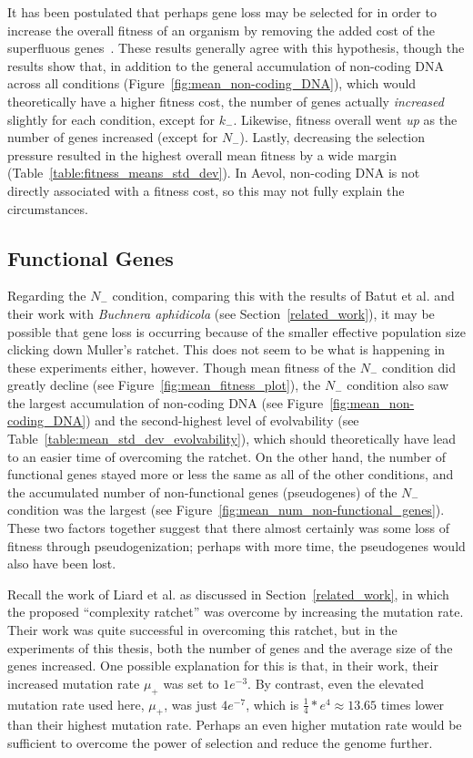 It has been postulated that perhaps gene loss may be selected for in order to increase the overall fitness of an organism by removing the added cost of the superfluous genes~\cite{koskiniemi2012}. These results generally agree with this hypothesis, though the results show that, in addition to the general accumulation of non-coding DNA across all conditions (Figure~\ref{fig:mean_non-coding_DNA}), which would theoretically have a higher fitness cost, the number of genes actually \textit{increased} slightly for each condition, except for $k_-$. Likewise, fitness overall went \textit{up} as the number of genes increased (except for $N_-$). Lastly, decreasing the selection pressure resulted in the highest overall mean fitness by a wide margin (Table~\ref{table:fitness_means_std_dev}). In Aevol, non-coding DNA is not directly associated with a fitness cost, so this may not fully explain the circumstances.  

\subsection{Functional Genes}
Regarding the $N_-$ condition, comparing this with the results of Batut et al. and their work with \textit{Buchnera aphidicola} (see Section~\ref{related_work}), it may be possible that gene loss is occurring because of the smaller effective population size clicking down Muller's ratchet. This does not seem to be what is happening in these experiments either, however. Though mean fitness of the $N_-$ condition did greatly decline (see Figure~\ref{fig:mean_fitness_plot}), the $N_-$ condition also saw the largest accumulation of non-coding DNA (see Figure~\ref{fig:mean_non-coding_DNA}) and the second-highest level of evolvability (see Table~\ref{table:mean_std_dev_evolvability}), which should theoretically have lead to an easier time of overcoming the ratchet. On the other hand, the number of functional genes stayed more or less the same as all of the other conditions, and the accumulated number of non-functional genes (pseudogenes) of the $N_-$ condition was the largest (see Figure~\ref{fig:mean_num_non-functional_genes}). These two factors together suggest that there almost certainly was some loss of fitness through pseudogenization; perhaps with more time, the pseudogenes would also have been lost.

Recall the work of Liard et al.\cite{Liard.2018} as discussed in Section~\ref{related_work}, in which the proposed ``complexity ratchet'' was overcome by increasing the mutation rate. Their work was quite successful in overcoming this ratchet, but in the experiments of this thesis, both the number of genes and the average size of the genes increased. One possible explanation for this is that, in their work, their increased mutation rate $\mu_+$ was set to $1e^{-3}$.  By contrast, even the elevated mutation rate used here, $\mu_+$, was just $4e^{-7}$, which is $\frac{1}{4}*e^4 \approx 13.65$ times lower than their highest mutation rate. Perhaps an even higher mutation rate would be sufficient to overcome the power of selection and reduce the genome further. 

